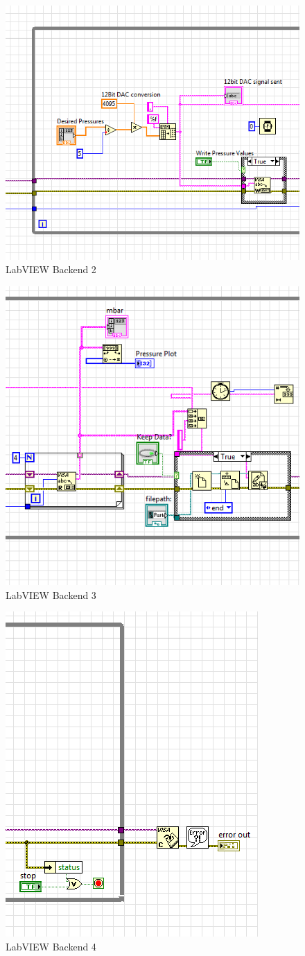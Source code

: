 \begin{figure}[h]
\centering 
\includegraphics[width=0.60\columnwidth]{backend12.PNG} 
\caption[LabVIEW Backend 2]{LabVIEW Backend 2} 
\label{fig:backend12} 
\end{figure}

\begin{figure}[h]
\centering 
\includegraphics[width=0.60\columnwidth]{backend13.PNG} 
\caption[LabVIEW Backend 3]{LabVIEW Backend 3} 
\label{fig:backend13} 
\end{figure}

\begin{figure}[h]
\centering 
\includegraphics[width=0.60\columnwidth]{backend14.PNG} 
\caption[LabVIEW Backend 4]{LabVIEW Backend 4} 
\label{fig:backend14} 
\end{figure}
